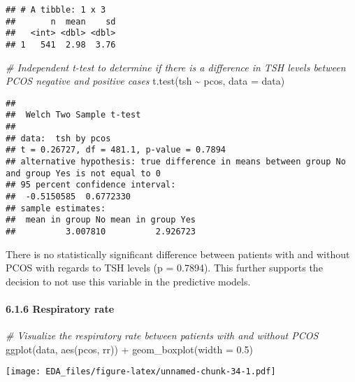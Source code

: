 \documentclass[
]{article}
\newenvironment{Shaded}{\begin{snugshade}}{\end{snugshade}}
\newcommand{\AttributeTok}[1]{\textcolor[rgb]{0.77,0.63,0.00}{#1}}
\newcommand{\CommentTok}[1]{\textcolor[rgb]{0.56,0.35,0.01}{\textit{#1}}}
\newcommand{\FloatTok}[1]{\textcolor[rgb]{0.00,0.00,0.81}{#1}}
\newcommand{\FunctionTok}[1]{\textcolor[rgb]{0.00,0.00,0.00}{#1}}
\newcommand{\NormalTok}[1]{#1}
\newcommand{\SpecialCharTok}[1]{\textcolor[rgb]{0.00,0.00,0.00}{#1}}
\begin{document}
\begin{verbatim}
## # A tibble: 1 x 3
##       n  mean    sd
##   <int> <dbl> <dbl>
## 1   541  2.98  3.76
\end{verbatim}

\begin{Shaded}
\begin{Highlighting}[]
\CommentTok{\# Independent t{-}test to determine if there is a difference in TSH levels between PCOS negative and positive cases}
\FunctionTok{t.test}\NormalTok{(tsh }\SpecialCharTok{\textasciitilde{}}\NormalTok{ pcos, }\AttributeTok{data =}\NormalTok{ data)}
\end{Highlighting}
\end{Shaded}

\begin{verbatim}
## 
##  Welch Two Sample t-test
## 
## data:  tsh by pcos
## t = 0.26727, df = 481.1, p-value = 0.7894
## alternative hypothesis: true difference in means between group No and group Yes is not equal to 0
## 95 percent confidence interval:
##  -0.5150585  0.6772330
## sample estimates:
##  mean in group No mean in group Yes 
##          3.007810          2.926723
\end{verbatim}

There is no statistically significant difference between patients with
and without PCOS with regards to TSH levels (p = 0.7894). This further
supports the decision to not use this variable in the predictive models.

\hypertarget{respiratory-rate}{%
\paragraph{6.1.6 Respiratory rate}\label{respiratory-rate}}

\begin{Shaded}
\begin{Highlighting}[]
\CommentTok{\# Visualize the respiratory rate between patients with and without PCOS}
\FunctionTok{ggplot}\NormalTok{(data, }\FunctionTok{aes}\NormalTok{(pcos, rr)) }\SpecialCharTok{+} \FunctionTok{geom\_boxplot}\NormalTok{(}\AttributeTok{width =} \FloatTok{0.5}\NormalTok{)}
\end{Highlighting}
\end{Shaded}

\texttt{[image: EDA\_files/figure-latex/unnamed-chunk-34-1.pdf]}
\end{document}
